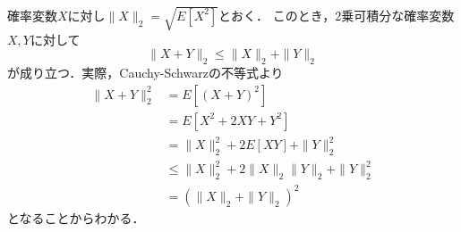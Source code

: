 \documentclass{jsarticle}
\begin{document}
確率変数$X$に対し$\|X\|_2=\sqrt{E[X^2]}$とおく．
このとき，2乗可積分な確率変数$X,Y$に対して
\[ \|X+Y\|_2\leq\|X\|_2+\|Y\|_2 \]
が成り立つ．実際，Cauchy-Schwarzの不等式より
\begin{align*}
\|X+Y\|_2^2
&=E[(X+Y)^2] \\
&=E[X^2+2XY+Y^2] \\
&=\|X\|_2^2+2E[XY]+\|Y\|_2^2 \\
&\leq\|X\|_2^2+2\|X\|_2\|Y\|_2+\|Y\|_2^2 \\
&=(\|X\|_2+\|Y\|_2)^2
\end{align*}
となることからわかる．
\end{document}
